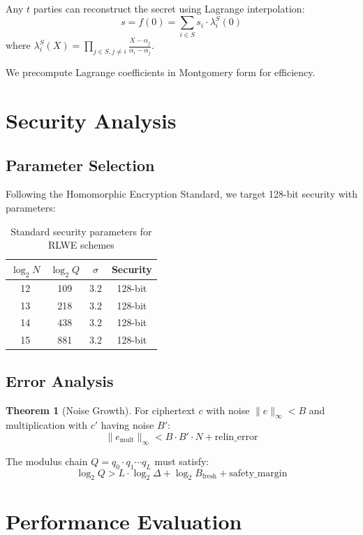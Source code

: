 \documentclass[11pt,a4paper]{article}
\theoremstyle{definition}
\newtheorem{theorem}{Theorem}
\begin{document}
Any $t$ parties can reconstruct the secret using Lagrange interpolation:
\[
s = f(0) = \sum_{i \in S} s_i \cdot \lambda_i^S(0)
\]
where $\lambda_i^S(X) = \prod_{j \in S, j \neq i} \frac{X - \alpha_j}{\alpha_i - \alpha_j}$.

We precompute Lagrange coefficients in Montgomery form for efficiency.

\section{Security Analysis}

\subsection{Parameter Selection}

Following the Homomorphic Encryption Standard, we target 128-bit security with parameters:

\begin{table}[h]
\centering
\begin{tabular}{cccc}
\toprule
$\log_2 N$ & $\log_2 Q$ & $\sigma$ & Security \\
\midrule
12 & 109 & 3.2 & 128-bit \\
13 & 218 & 3.2 & 128-bit \\
14 & 438 & 3.2 & 128-bit \\
15 & 881 & 3.2 & 128-bit \\
\bottomrule
\end{tabular}
\caption{Standard security parameters for RLWE schemes}
\end{table}

\subsection{Error Analysis}

\begin{theorem}[Noise Growth]
For ciphertext $c$ with noise $\|e\|_\infty < B$ and multiplication with $c'$ having noise $B'$:
\[
\|e_{\text{mult}}\|_\infty < B \cdot B' \cdot N + \text{relin\_error}
\]
\end{theorem}

The modulus chain $Q = q_0 \cdot q_1 \cdots q_L$ must satisfy:
\[
\log_2 Q > L \cdot \log_2 \Delta + \log_2 B_{\text{fresh}} + \text{safety\_margin}
\]

\section{Performance Evaluation}
\end{document}

